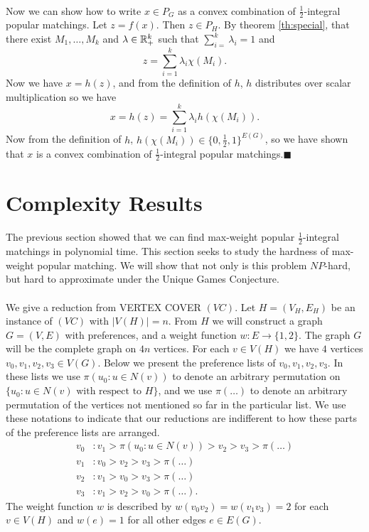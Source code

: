 \documentclass[letterpaper,12pt,oneside,onecolumn]{article}
\begin{document}
\paragraph{}
Now we can show how to write $x \in P_G$ as a convex combination of $\frac{1}{2}$-integral popular matchings. Let $z=f(x)$. Then $z \in P_H$. By theorem \ref{th:special}, that there exist $M_1, \dots, M_k$ and $\lambda \in \mathbb{R}_+^k$ such that $\sum_{i=}^k \lambda_i = 1$ and 
$$z = \sum_{i=1}^k \lambda_i \chi(M_i).$$
Now we have $x = h(z)$, and from the definition of $h$, $h$ distributes over scalar multiplication so we have
$$x = h(z) = \sum_{i=1}^k \lambda_i h(\chi(M_i)).$$
Now from the definition of $h$, $h(\chi(M_i)) \in \{0,\frac{1}{2}, 1\}^{E(G)}$, so we have shown that $x$ is a convex combination of $\frac{1}{2}$-integral popular matchings.$\blacksquare$
\section{Complexity Results}\label{sec:complexity}
\paragraph{}
The previous section showed that we can find max-weight popular $\frac{1}{2}$-integral matchings in polynomial time. This section seeks to study the hardness of max-weight popular matching. We will show that not only is this problem $NP$-hard, but hard to approximate under the Unique Games Conjecture.
\paragraph{}
We give a reduction from VERTEX COVER $(VC)$. Let $H = (V_H, E_H)$ be an instance of $(VC)$ with $|V(H)| = n$. From $H$ we will construct a graph $G=(V,E)$ with preferences, and a weight function $w: E \rightarrow \{1,2\}$. The graph $G$ will be the complete graph on $4n$ vertices. For each $v \in V(H)$ we have $4$ vertices $v_0, v_1, v_2, v_3 \in V(G)$. Below we present the preference lists of $v_0,v_1,v_2,v_3$. In these lists we use $\pi(u_0: u \in N(v))$ to denote an arbitrary permutation on  $\{u_0: u \in N(v) \text{ with respect to $H$}\}$, and we use $\pi(\dots)$ to denote an arbitrary permutation of the vertices not mentioned so far in the particular list. We use these notations to indicate that our reductions are indifferent to how these parts of the preference lists are arranged.
\begin{align*}
v_0 &: v_1 > \pi(u_0: u \in N(v)) > v_2 > v_3 >\pi(\dots) \\
v_1 &: v_0 > v_2 > v_3 > \pi(\dots) \\
v_2 &: v_1 > v_0 > v_3 > \pi(\dots) \\
v_3 &: v_1 > v_2 > v_0 > \pi(\dots).
\end{align*}
The weight function $w$ is described by $w(v_0v_2) = w(v_1v_3) = 2$ for each $v \in V(H)$ and $w(e) = 1$ for all other edges $e\in E(G)$. 
\end{document}
